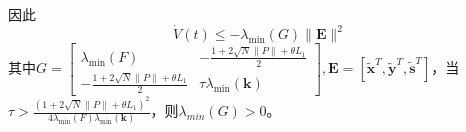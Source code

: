 \documentclass[12pt, a4paper, oneside]{ctexbook}
\begin{document}
因此
$$
    \dot{V}(t) \leq -\lambda_{\min}(G)\|\mathbf{E}\|^2
$$
其中$\left.G=\left[\begin{array}{cc}\lambda_{\min}(F)&-\frac{1+2\sqrt{N}\|P\|+\theta L_1}2\\-\frac{1+2\sqrt{N}\|P\|+\theta L_1}2&\tau\lambda_{\min}(\mathbf{k})\end{array}\right.\right],
    \mathbf{E} = [\tilde{\mathbf{x}}^T,\tilde{\mathbf{y}}^T,\tilde{\mathbf{s}}^T]$，当
$\tau>\frac{(1+2\sqrt{N}\|P\|+\theta L_{1})^{2}}{4\lambda_{\mathrm{min}}(F)\lambda_{\mathrm{min}}(\mathbf{k})}$，则$\lambda_{min}(G) > 0$。
\end{document}
